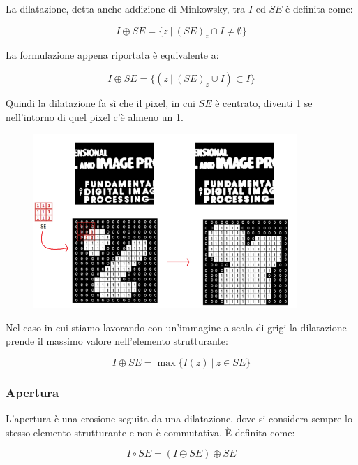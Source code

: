 La dilatazione, detta anche addizione di Minkowsky, tra $I$ ed $SE$ è
definita come:

$$
    I \oplus SE = \{z \ | \ (SE)_z \cap I \neq \emptyset\}
$$

La formulazione appena riportata è equivalente a:

$$
    I \oplus SE = \{(z \ | \ (SE)_z \cup I) \subset I\}
$$

Quindi la dilatazione fa sì
che il pixel, in cui $SE$ è centrato, diventi 1 se nell'intorno di quel pixel
c'è almeno un 1.

\begin{figure}[H]
    \centering
    \includegraphics[width=10cm, keepaspectratio]{capitoli/immagini/imgs/dilatazione-esempio.png}
\end{figure}

Nel caso in cui stiamo lavorando con un'immagine a scala di grigi
la dilatazione prende il massimo valore nell'elemento strutturante:

$$
    I \oplus SE = \max\{I(z) \ | \ z \in SE\}
$$




\subsubsection{Apertura}
L'apertura è una erosione seguita da una dilatazione, dove si considera sempre lo stesso elemento strutturante e non è commutativa.
È definita come:

$$
    I \circ SE = (I \ominus SE) \oplus SE
$$

